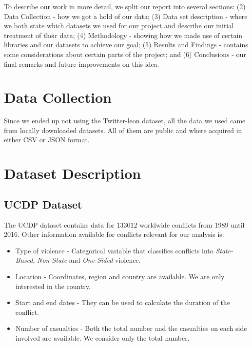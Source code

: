 \documentclass[11pt]{article}
\begin{document}
	To describe our work in more detail, we split our report into several sections: (2) Data Collection - how we got a hold of our data; (3) Data set description - where we both state which datasets we used for our project and describe our initial treatment of their data; (4) Methodology - showing how we made use of certain libraries and our datasets to achieve our goal; (5) Results and Findings - contains some considerations about certain parts of the project; and (6) Conclusions - our final remarks and future improvements on this idea.
	
	
	\section{Data Collection}
	Since we ended up not using the Twitter-leon dataset, all the data we used came from locally downloaded datasets. All of them are public and where acquired in either CSV or JSON format.
	
	\section{Dataset Description}
	\subsection{UCDP Dataset}
	\label{sub:ucdp_dataset}
	The UCDP dataset contains data for $133 012$ worldwide conflicts from 1989
	until 2016. Other information available for  conflicts relevant for our analysis
	is:
	\begin{itemize}
		\item Type of violence - Categorical variable that classifies conflicts into
		\emph{State-Based},  \emph{Non-State} and \emph{One-Sided} violence.
		\item Location - Coordinates, region and country are available. We are only
		interested in the country.
		\item Start and end dates - They can be used to calculate the duration of
		the conflict.
		\item Number of casualties - Both the total number and the casualties on
		each side involved are available. We consider only the total number.
	\end{itemize}
	
\end{document}
